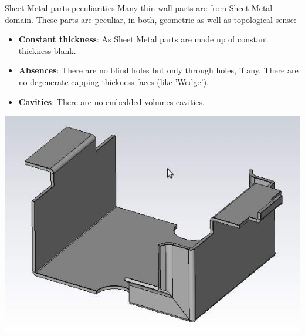 \begin{frame}{Sheet Metal parts peculiarities}
Many thin-wall parts are from Sheet Metal domain. These parts are peculiar, in both, geometric as well as topological sense:
\begin{itemize}[noitemsep,label=\textbullet,topsep=2pt,parsep=2pt,partopsep=2pt]
\item \textbf{Constant thickness}: As Sheet Metal parts are made up of constant thickness blank.
%

\item \textbf{Absences}: There are no blind holes but only through holes, if any. There are no degenerate capping-thickness faces (like 'Wedge').
\item \textbf{Cavities}: There are no embedded volumes-cavities.
\end{itemize}


\begin{center}
\includegraphics[width=0.45\linewidth]{../Common/images/SheetMetal}
\end{center}
\end{frame}


